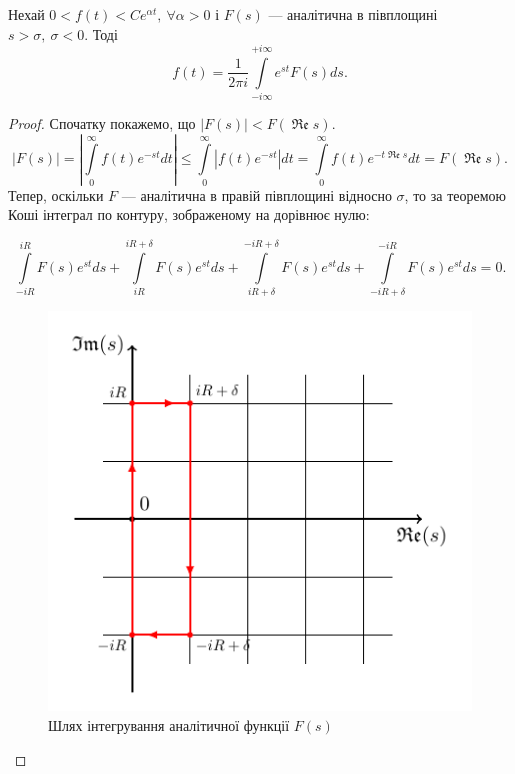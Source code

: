 \begin{corollary}
\label{eq:mellin_analytic}
Нехай $0 < f(t) < Ce^{\alpha t}, ~ \forall \alpha > 0$ і $F(s)$ --- аналітична в півплощині $s > \sigma, ~\sigma < 0$. Тоді
\begin{equation}
f(t) = \frac{1}{2\pi i}\int\limits_{- i\infty}^{+ i\infty} e^{st} F(s) ds.
\end{equation}
\begin{proof}
Спочатку покажемо, що $|F(s)| < F(\operatorname{\mathfrak{Re}} s)$.
\begin{equation*}
|F(s)| = \left| \int\limits_{0}^{\infty}  f(t) e^{-st} dt \right| \leq \int\limits_{0}^{\infty} \left|f(t) e^{-st} \right| dt = \int\limits_{0}^{\infty} f(t)  e^{-t\operatorname{\mathfrak{Re}} s}  dt = F(\operatorname{\mathfrak{Re}} s).
\end{equation*}
Тепер, оскільки $F$ --- аналітична в правій півплощині відносно $\sigma$, то за теоремою Коші \cite{lavrentiev1965} інтеграл по контуру, зображеному на  дорівнює нулю:


\begin{equation*}
\int\limits_{-iR}^{iR} F(s) e^{st} ds + \int\limits_{iR}^{iR + \delta} F(s) e^{st} ds + \int\limits_{iR + \delta}^{-iR + \delta} F(s) e^{st} ds + \int\limits_{-iR + \delta}^{-iR} F(s) e^{st} ds = 0.
\end{equation*}

\begin{figure}[h]
\centering
\includegraphics{chapter_Asymptotics/img/contour_mellin}
\caption{Шлях інтегрування аналітичної функції $F(s)$}
\label{fig:contour_mellin}
\end{figure}


\end{proof}
\end{corollary}

